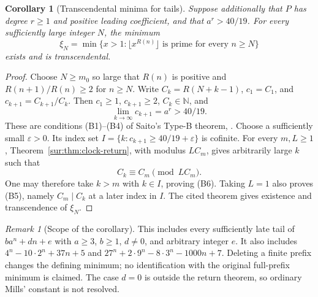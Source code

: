 \documentclass[11pt,a4paper]{article}
\newtheorem{corollary}[theorem]{Corollary}
\theoremstyle{definition}
\theoremstyle{remark}
\newtheorem{remark}[theorem]{Remark}
\numberwithin{equation}{section}
\begin{document}
\begin{corollary}[Transcendental minima for tails]\label{sur:cor:clock-minimum}
Suppose additionally that $P$ has degree $r\ge1$ and positive leading
coefficient, and that $a^r>40/19$. For every sufficiently large integer
$N$, the minimum
\[
 \xi_N=\min\{x>1:\lfloor x^{R(n)}\rfloor\text{ is prime for every }n\ge N\}
\]
exists and is transcendental.
\end{corollary}
\begin{proof}
Choose $N\ge m_0$ so large that $R(n)$ is positive and
$R(n+1)/R(n)\ge2$ for $n\ge N$. Write
$C_k=R(N+k-1)$, $c_1=C_1$, and $c_{k+1}=C_{k+1}/C_k$.
Then $c_1\ge1$, $c_{k+1}\ge2$, $C_k\in\mathbb N$, and
\[
 \lim_{k\to\infty}c_{k+1}=a^r>40/19.
\]
These are conditions (B1)--(B4) of Saito's Type-B theorem,
\cite[Theorem~2.3]{SaitoVariants}. Choose a sufficiently small
$\varepsilon>0$. Its index set
$I=\{k:c_{k+1}\ge40/19+\varepsilon\}$ is cofinite. For every $m,L\ge1$,
Theorem~\ref{sur:thm:clock-return}, with modulus $LC_m$, gives arbitrarily
large $k$ such that
\[
 C_k\equiv C_m\pmod{LC_m}.
\]
One may therefore take $k>m$ with $k\in I$, proving (B6). Taking
$L=1$ also proves (B5), namely $C_m\mid C_k$ at a later index in $I$.
The cited theorem gives existence and transcendence of $\xi_N$.
\end{proof}

\begin{remark}[Scope of the corollary]
This includes every sufficiently late tail of $ba^n+dn+e$ with
$a\ge3$, $b\ge1$, $d\ne0$, and arbitrary integer $e$. It also includes
$4^n-10\cdot2^n+37n+5$ and
$27^n+2\cdot9^n-8\cdot3^n-1000n+7$.
Deleting a finite prefix changes the defining minimum; no identification
with the original full-prefix minimum is claimed. The case $d=0$ is
outside the return theorem, so ordinary Mills' constant is not resolved.
\end{remark}
\end{document}
